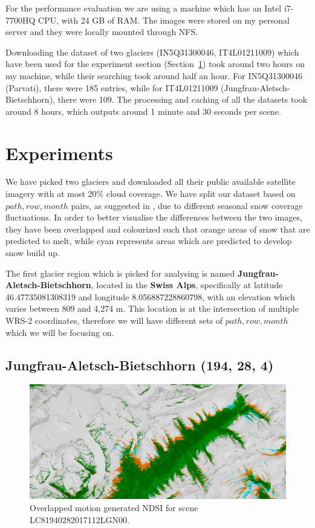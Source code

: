 \documentclass[12pt, a4paper]{report}
\begin{document}
	For the performance evaluation we are using a machine which has an Intel i7-7700HQ CPU, with 24 GB of RAM. The images were stored on my personal server and they were locally mounted through NFS.
	
	Downloading the dataset of two glaciers (IN5Q31300046, IT4L01211009) which have been used for the experiment section (Section~\ref{seq:experiments}) took around two hours on my machine, while their searching took around half an hour. For IN5Q31300046 (Parvati), there were 185 entries, while for IT4L01211009 (Jungfrau-Aletsch-Bietschhorn), there were 109. The processing and caching of all the datasets took around 8 hours, which outputs around 1 minute and 30 seconds per scene.
	
	\section{Experiments}
	\label{seq:experiments}
	
	\par We have picked two glaciers and downloaded all their public available satellite imagery with at most 20\% cloud coverage. We have split our dataset based on \(path, row, month\) pairs, as suggested in \cite{RACOVITEANU2019}, due to different seasonal snow coverage fluctuations. In order to better visualise the differences between the two images, they have been
	overlapped and colourized such that orange areas of snow that are predicted to melt,
	while cyan represents areas which are predicted to develop snow build up.
	
	\par The first glacier region which is picked for analysing is named \textbf{Jungfrau-Aletsch-Bietschhorn}, located in the \textbf{Swiss Alps}, specifically at latitude 46.47735081308319 and longitude 8.056887228860798, with an elevation which varies between 809 and 4,274 m. This location is at the intersection of multiple WRS-2 coordinates, therefore we will have different sets of \(path, row, month\) which we will be focusing on.
	
	\subsection{Jungfrau-Aletsch-Bietschhorn (194, 28, 4)}
	
	\begin{figure}[h!]
		\centering
		\includegraphics[width=\linewidth]{../images/experiment_1940284_image.png}
		\caption{Overlapped motion generated NDSI for scene LC81940282017112LGN00.}
		\label{fig:experiment_1940284_image}
	\end{figure}
\end{document}

